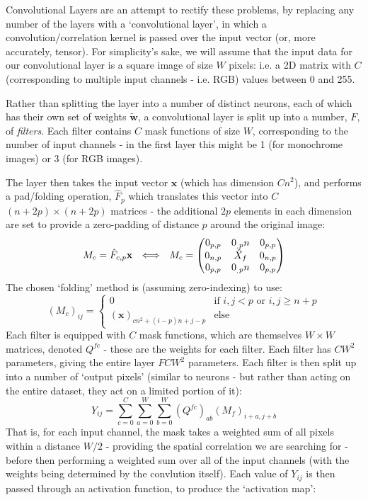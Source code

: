 \documentclass[10pt, twocolumn]{article}
\renewcommand\vec[1]{\boldsymbol{\textbf{#1}}}
\newcommand\cec[1]{\tilde{\vec{#1}}}
\begin{document}
		Convolutional Layers are an attempt to rectify these problems, by replacing any number of the layers with a `convolutional layer', in which a convolution/correlation kernel is passed over the input vector (or, more accurately, tensor). For simplicity's sake, we will assume that  the input data for our convolutional layer is a square image of size $W$ pixels: i.e. a 2D matrix with $C$ (corresponding to multiple input channels - i.e. RGB) values between 0 and 255.

		Rather than splitting the layer into a number of distinct neurons, each of which has their own set of weights $\cec{w}$, a convolutional layer is split up into a number, $F$, of \textit{filters}. Each filter contains $C$ mask functions of size $W$, corresponding to the number of input channels - in the first layer this might be 1 (for monochrome images) or 3 (for RGB images). 

		The layer then takes the input vector $\vec{x}$ (which has dimension $C n^2$), and performs a pad/folding operation, $\hat{F}_p$ which translates this vector into $C$ $(n+2p)\times (n+2p)$ matrices - the additional $2p$ elements in each dimension are set to provide a zero-padding of distance $p$ around the original image:
		\newcommand\zp[2]{0_{#1,#2}}
		\begin{equation}
			M_c = \hat{F}_{c,p} \vec{x} \LLR M_c = \begin{pmatrix} 
				\zp{p}{p} & \zp_{p}{n} & \zp{p}{p}
				\\
				\zp{n}{p}	& \hat{X}_f & \zp{n}{p}
				\\
				\zp{p}{p} & \zp_{p}{n} & \zp{p}{p}
			\end{pmatrix}
		\end{equation}
		The chosen `folding' method is (assuming zero-indexing) to use:
		\begin{equation}
			(M_c)_{ij} = \begin{cases}
				0 & \text{if } i,j < p \text{ or } i,j \geq n + p 
				\\
				(\vec{x})_{c n ^2 + (i-p) n + j-p} & \text{else}
			\end{cases}
		\end{equation}
		Each filter is equipped with $C$ mask functions, which are themselves $W\times W$ matrices, denoted $Q^{fc}$ - these are the weights for each filter. Each filter has $C W^2$ parameters, giving the entire layer $F C W^2$ parameters. Each filter is then split up into a number of `output pixels' (similar to neurons - but rather than acting on the entire dataset, they act on a limited portion of it):
		\begin{equation}
			Y_{ij} = \sum_{c = 0}^C \sum_{a = 0}^{W} \sum_{b = 0}^W (Q^{fc})_{ab} (M_f)_{i+a,j+b}
		\end{equation}
		That is, for each input channel, the mask takes a weighted sum of all pixels within a distance $W/2$ - providing the spatial correlation we are searching for - before then performing a weighted sum over all of the input channels (with the weights being determined by the convlution itself). Each value of $Y_{ij}$ is then passed through an activation function, to produce the `activation map':
\end{document}
